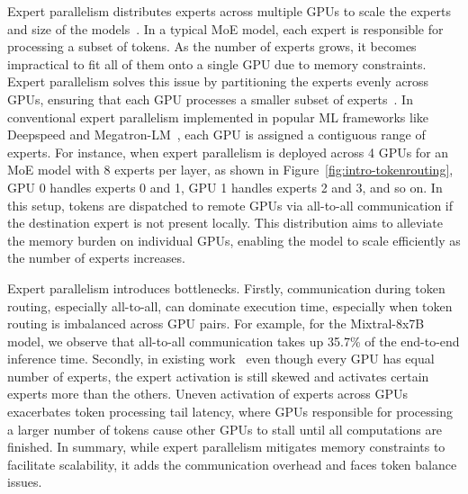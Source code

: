 Expert parallelism distributes experts across multiple GPUs to scale the experts and size of the models~\cite{deepspeed-moe, exflow,  li2023accelerating, fastermoe, fastmoe,cai2024shortcut, singh2023hybrid}.
%
In a typical MoE model, each expert is responsible for processing a subset of tokens. 
%
As the number of experts grows, it becomes impractical to fit all of them onto a single GPU due to memory constraints. 
%
Expert parallelism solves this issue by partitioning the experts evenly across GPUs, ensuring that each GPU processes a smaller subset of experts~\cite{deepspeed-moe, li2023accelerating}.
%
In conventional expert parallelism implemented in popular ML frameworks like Deepspeed and Megatron-LM~\cite{deepspeed,megatron}, each GPU is assigned a contiguous range of experts.
%
For instance, when expert parallelism is deployed across 4 GPUs for an MoE model with 8 experts per layer, as shown in Figure~\ref{fig:intro-tokenrouting}, GPU 0 handles experts 0 and 1, GPU 1 handles experts 2 and 3, and so on.
%
In this setup, tokens are dispatched to remote GPUs via all-to-all communication if the destination expert is not present locally. 
%
This distribution aims to alleviate the memory burden on individual GPUs, enabling the model to scale efficiently as the number of experts increases.

Expert parallelism introduces bottlenecks. 
%
Firstly, communication during token routing, especially all-to-all, can dominate execution time, especially when token routing is imbalanced across GPU pairs. 
%
For example, for the Mixtral-8x7B~\cite{mixtral} model, we observe that all-to-all communication takes up 35.7\% of the end-to-end inference time.
%
Secondly, in existing work~\cite{exflow,li2023accelerating, fastermoe, singh2023hybrid} even though every GPU has equal number of experts, the expert activation is still skewed and activates certain experts more than the others. 
%
Uneven activation of experts across GPUs exacerbates token processing tail latency, where GPUs responsible for processing a larger number of tokens cause other GPUs to stall until all computations are finished. 
%
In summary, while expert parallelism mitigates memory constraints to facilitate scalability, it adds the communication overhead and faces token balance issues.

